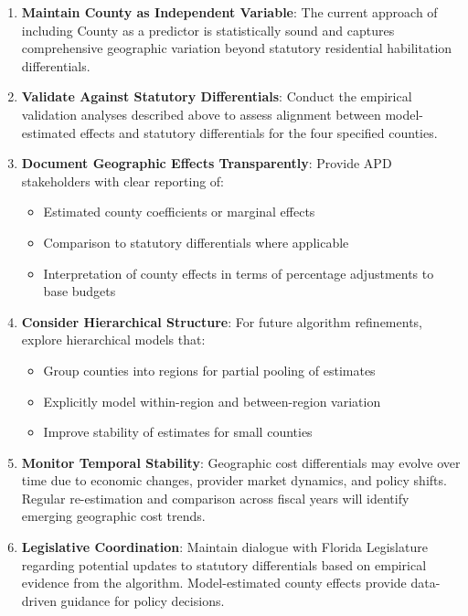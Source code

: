 \begin{enumerate}
    \item \textbf{Maintain County as Independent Variable}: The current approach of including County as a predictor is statistically sound and captures comprehensive geographic variation beyond statutory residential habilitation differentials.
    
    \item \textbf{Validate Against Statutory Differentials}: Conduct the empirical validation analyses described above to assess alignment between model-estimated effects and statutory differentials for the four specified counties.
    
    \item \textbf{Document Geographic Effects Transparently}: Provide APD stakeholders with clear reporting of:
    \begin{itemize}
        \item Estimated county coefficients or marginal effects
        \item Comparison to statutory differentials where applicable
        \item Interpretation of county effects in terms of percentage adjustments to base budgets
    \end{itemize}
    
    \item \textbf{Consider Hierarchical Structure}: For future algorithm refinements, explore hierarchical models that:
    \begin{itemize}
        \item Group counties into regions for partial pooling of estimates
        \item Explicitly model within-region and between-region variation
        \item Improve stability of estimates for small counties
    \end{itemize}
    
    \item \textbf{Monitor Temporal Stability}: Geographic cost differentials may evolve over time due to economic changes, provider market dynamics, and policy shifts. Regular re-estimation and comparison across fiscal years will identify emerging geographic cost trends.
    
    \item \textbf{Legislative Coordination}: Maintain dialogue with Florida Legislature regarding potential updates to statutory differentials based on empirical evidence from the algorithm. Model-estimated county effects provide data-driven guidance for policy decisions.
\end{enumerate}

